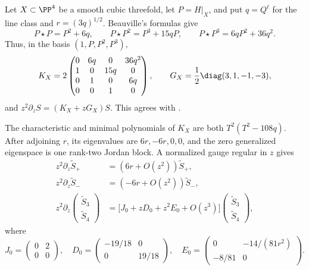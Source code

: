 Let \(X\subset\PP^4\) be a smooth cubic threefold, let \(P=H|_X\), and put
\(q=Q^\ell\) for the line class and \(r=(3q)^{1/2}\).  Beauville's formulas
give \cite[main theorem and (2.1)--(2.3)]{Beauville}
\begin{equation}
 P\star P=P^2+6q,\qquad
 P\star P^2=P^3+15qP,\qquad
 P\star P^3=6qP^2+36q^2.
 \label{eq:beauville-cubic-products}
\end{equation}
Thus, in the basis \((1,P,P^2,P^3)\),
\begin{equation}
 K_X=2\begin{pmatrix}
 0&6q&0&36q^2\\1&0&15q&0\\0&1&0&6q\\0&0&1&0
 \end{pmatrix},
 \qquad G_X=\frac12\diag(3,1,-1,-3),
 \label{eq:cubic-small-even-connection}
\end{equation}
and \(z^2\partial_zS=(K_X+zG_X)S\).  This agrees with
\cite[Section~3]{Cai}.

\begin{proposition}
\label{prop:cubic-block-data}
%
%
%
The characteristic and minimal polynomials of \(K_X\) are both
\(T^2(T^2-108q)\).  After adjoining \(r\), its eigenvalues are
\(6r,-6r,0,0\), and the zero generalized eigenspace is one rank-two Jordan
block.  A normalized gauge regular in \(z\) gives
\begin{equation}
 \begin{aligned}
 z^2\partial_z\widetilde S_+&=(6r+O(z^2))\widetilde S_+,\\
 z^2\partial_z\widetilde S_-&=(-6r+O(z^2))\widetilde S_-,\\
 z^2\partial_z
 \begin{pmatrix}\widetilde S_3\\\widetilde S_4\end{pmatrix}
 &=\bigl[J_0+zD_0+z^2E_0+O(z^3)\bigr]
 \begin{pmatrix}\widetilde S_3\\\widetilde S_4\end{pmatrix},
 \end{aligned}
 \label{eq:cubic-integral-block-reduction}
\end{equation}
where
\begin{equation}
 J_0=\begin{pmatrix}0&2\\0&0\end{pmatrix},\quad
 D_0=\begin{pmatrix}-19/18&0\\0&19/18\end{pmatrix},\quad
 E_0=\begin{pmatrix}0&-14/(81r^2)\\-8/81&0\end{pmatrix}.
 \label{eq:cubic-shared-block-data}
\end{equation}
\end{proposition}

